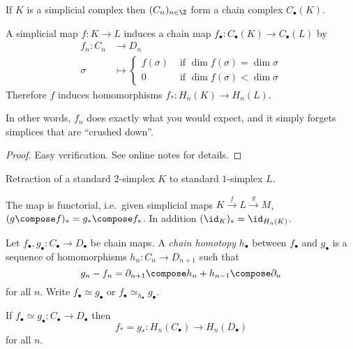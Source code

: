 \documentclass[a4paper]{article}
\renewcommand{\b}{\partial} %
\begin{document}
\begin{eg}
  If \(K\) is a simplicial complex then \((C_n)_{n \in \Z}\) form a chain complex \(C_\bullet(K)\).
\end{eg}

\begin{lemma}
  A simplicial map \(f: K \to L\) induces a chain map \(f_\bullet: C_\bullet(K) \to C_\bullet(L)\) by
  \begin{align*}
    f_n: C_n &\to D_n \\
    \sigma &\mapsto
             \begin{cases}
               f(\sigma) & \text{ if } \dim f(\sigma) = \dim \sigma \\
               0 & \text{ if } \dim f(\sigma) < \dim \sigma
             \end{cases}
  \end{align*}
  Therefore \(f\) induces homomorphisms \(f_*: H_n(K) \to H_n(L)\).
\end{lemma}

In other words, \(f_n\) does exactly what you would expect, and it simply forgets simplices that are ``crushed down''.

\begin{proof}
  Easy verification. See online notes for details.
\end{proof}

\begin{eg}
  Retraction of a standard \(2\)-simplex \(K\) to standard \(1\)-simplex \(L\).
\end{eg}

\begin{remark}
  The map is functorial, i.e.\ given simplicial maps \(K \xrightarrow{f} L \xrightarrow{g} M\), \((g \compose f)_* = g_* \compose f_*\). In addition \((\id_K)_* = \id_{H_n(K)}\).
\end{remark}

\begin{definition}
  Let \(f_\bullet, g_\bullet: C_\bullet \to D_\bullet\) be chain maps. A \emph{chain homotopy} \(h_\bullet\) between \(f_\bullet\) and \(g_\bullet\) is a sequence of homomorphisms \(h_n: C_n \to D_{n + 1}\) such that
  \[
    g_n - f_n = \b_{n + 1} \compose h_n + h_{n - 1} \compose \b_n
  \]
  for all \(n\). Write \(f_\bullet \simeq g_\bullet\) or \(f_\bullet \simeq_{h_\bullet} g_\bullet\).
\end{definition}

\begin{lemma}
  If \(f_\bullet \simeq g_\bullet: C_\bullet \to D_\bullet\) then
  \[
    f_* = g_*: H_n(C_\bullet) \to H_n(D_\bullet)
  \]
  for all \(n\).
\end{lemma}
\end{document}
